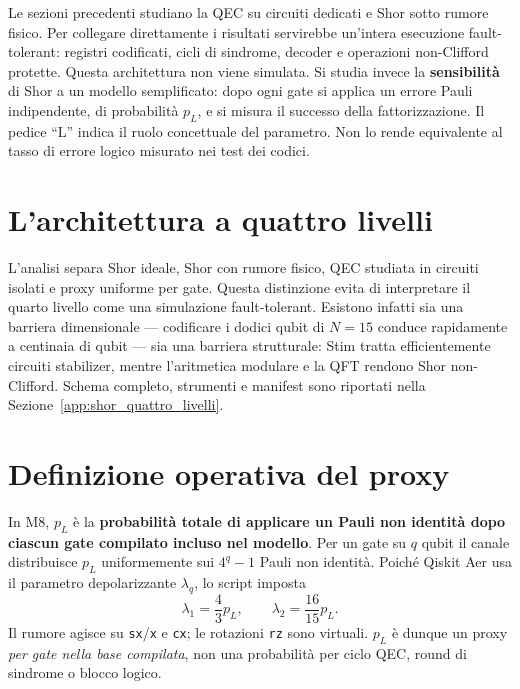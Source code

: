 \begin{onehalfspace}

Le sezioni precedenti studiano la QEC su circuiti dedicati e Shor sotto rumore fisico. Per collegare direttamente i risultati servirebbe un'intera esecuzione fault-tolerant: registri codificati, cicli di sindrome, decoder e operazioni non-Clifford protette. Questa architettura non viene simulata. Si studia invece la \textbf{sensibilit\`a} di Shor a un modello semplificato: dopo ogni gate si applica un errore Pauli indipendente, di probabilit\`a $p_L$, e si misura il successo della fattorizzazione. Il pedice ``L'' indica il ruolo concettuale del parametro. Non lo rende equivalente al tasso di errore logico misurato nei test dei codici.

\section{L'architettura a quattro livelli}
\label{sec:quattro_livelli}

L'analisi separa Shor ideale, Shor con rumore fisico, QEC studiata in circuiti
isolati e proxy uniforme per gate. Questa distinzione evita di interpretare il
quarto livello come una simulazione fault-tolerant. Esistono infatti sia una
barriera dimensionale --- codificare i dodici qubit di $N=15$ conduce
rapidamente a centinaia di qubit --- sia una barriera strutturale: Stim tratta
efficientemente circuiti stabilizer, mentre l'aritmetica modulare e la
\ac{QFT} rendono Shor non-Clifford. Schema completo, strumenti e manifest sono
riportati nella Sezione~\ref{app:shor_quattro_livelli}.

\section{Definizione operativa del proxy}
\label{sec:modello_logico}

In M8, $p_L$ \`e la \textbf{probabilit\`a totale di applicare un Pauli non
identit\`a dopo ciascun gate compilato incluso nel modello}. Per un gate su $q$
qubit il canale distribuisce $p_L$ uniformemente sui $4^q-1$ Pauli non
identit\`a. Poich\'e Qiskit Aer usa il parametro depolarizzante $\lambda_q$, lo
script imposta
\begin{equation}
    \lambda_1=\frac{4}{3}p_L,
    \qquad
    \lambda_2=\frac{16}{15}p_L.
\end{equation}
Il rumore agisce su \texttt{sx}/\texttt{x} e \texttt{cx}; le rotazioni
\texttt{rz} sono virtuali. $p_L$ \`e dunque un proxy \emph{per gate nella base
compilata}, non una probabilit\`a per ciclo QEC, round di sindrome o blocco
logico.


\end{onehalfspace}
